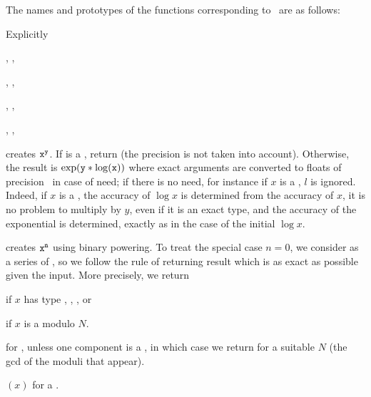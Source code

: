 \noindent The names and prototypes of the functions corresponding
to \op\ are as follows:




\noindent Explicitly

, ,

, ,

, ,

, ,


 creates ${\tt x}^{{\tt y}}$. If
 is a , return  (the precision  is not
taken into account). Otherwise, the result is $\exp({\tt y}*\log({\tt x}))$
where exact arguments are converted to floats of precision~ in case of
need; if there is no need, for instance if $x$ is a , $l$ is
ignored. Indeed, if $x$ is a , the accuracy of $\log x$ is
determined from the accuracy of $x$, it is no problem to multiply by $y$,
even if it is an exact type, and the accuracy of the exponential is
determined, exactly as in the case of the initial $\log x$.

 creates ${\tt x}^{{\tt n}}$ using
binary powering. To treat the special case $n = 0$, we consider
 as a series of , so we follow the rule of returning
result which is as exact as possible given the input. More precisely,
we return
\item {} if $x$ has type , ,  , or

\item {} if $x$ is a  modulo $N$.

\item {} for ,  unless one component
is a , in which case we return  for a suitable
$N$ (the gcd of the moduli that appear).

\item {}$(x)$ for a .


